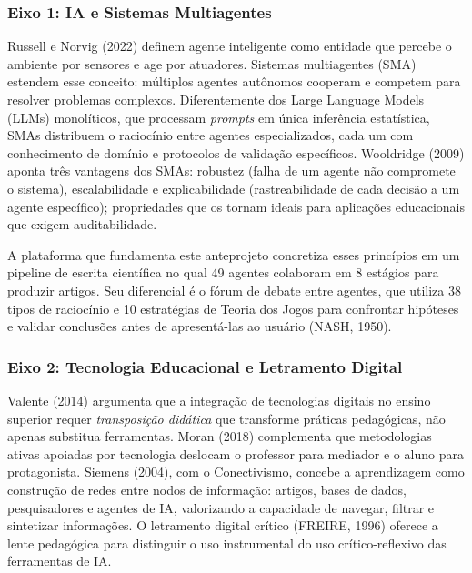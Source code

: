 \documentclass[
  brazilian,
  12pt,
]{article}
\begin{document}
\subsubsection{Eixo 1: IA e Sistemas
Multiagentes}\label{eixo-1-ia-e-sistemas-multiagentes}

Russell e Norvig (2022) definem agente inteligente como entidade que
percebe o ambiente por sensores e age por atuadores. Sistemas
multiagentes (SMA) estendem esse conceito: múltiplos agentes autônomos
cooperam e competem para resolver problemas complexos. Diferentemente
dos Large Language Models (LLMs) monolíticos, que processam
\emph{prompts} em única inferência estatística, SMAs distribuem o
raciocínio entre agentes especializados, cada um com conhecimento de
domínio e protocolos de validação específicos. Wooldridge (2009) aponta
três vantagens dos SMAs: robustez (falha de um agente não compromete o
sistema), escalabilidade e explicabilidade (rastreabilidade de cada
decisão a um agente específico); propriedades que os tornam ideais para
aplicações educacionais que exigem auditabilidade.

A plataforma que fundamenta este anteprojeto concretiza esses princípios
em um pipeline de escrita científica no qual 49 agentes colaboram em 8
estágios para produzir artigos. Seu diferencial é o fórum de debate
entre agentes, que utiliza 38 tipos de raciocínio e 10 estratégias de
Teoria dos Jogos para confrontar hipóteses e validar conclusões antes de
apresentá-las ao usuário (NASH, 1950).

\subsubsection{Eixo 2: Tecnologia Educacional e Letramento
Digital}\label{eixo-2-tecnologia-educacional-e-letramento-digital}

Valente (2014) argumenta que a integração de tecnologias digitais no
ensino superior requer \emph{transposição didática} que transforme
práticas pedagógicas, não apenas substitua ferramentas. Moran (2018)
complementa que metodologias ativas apoiadas por tecnologia deslocam o
professor para mediador e o aluno para protagonista. Siemens (2004), com
o Conectivismo, concebe a aprendizagem como construção de redes entre
nodos de informação: artigos, bases de dados, pesquisadores e agentes de
IA, valorizando a capacidade de navegar, filtrar e sintetizar
informações. O letramento digital crítico (FREIRE, 1996) oferece a lente
pedagógica para distinguir o uso instrumental do uso crítico-reflexivo
das ferramentas de IA.
\end{document}
